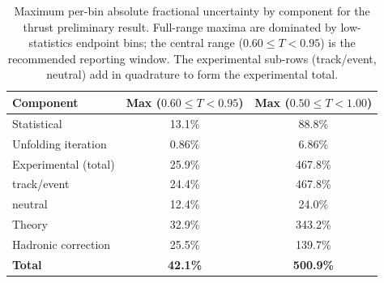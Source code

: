 \begin{table}[t!]
\centering
\begin{tabular}{l c c}
\hline
Component & Max ($0.60\le T<0.95$) & Max ($0.50\le T<1.00$) \\
\hline
Statistical          & 13.1\% & 88.8\% \\
Unfolding iteration  &  0.86\% & 6.86\% \\
Experimental (total) & 25.9\% & 467.8\% \\
\quad track/event    & 24.4\% & 467.8\% \\
\quad neutral        & 12.4\% & 24.0\% \\
Theory               & 32.9\% & 343.2\% \\
Hadronic correction  & 25.5\% & 139.7\% \\
\hline
\textbf{Total}       & \textbf{42.1\%} & \textbf{500.9\%} \\
\hline
\end{tabular}
\caption{Maximum per-bin absolute fractional uncertainty by component for the thrust preliminary result. Full-range maxima are dominated by low-statistics endpoint bins; the central range ($0.60\le T < 0.95$) is the recommended reporting window. The experimental sub-rows (track/event, neutral) add in quadrature to form the experimental total.}
\label{tab:uncertainty_breakdown}
\end{table}
